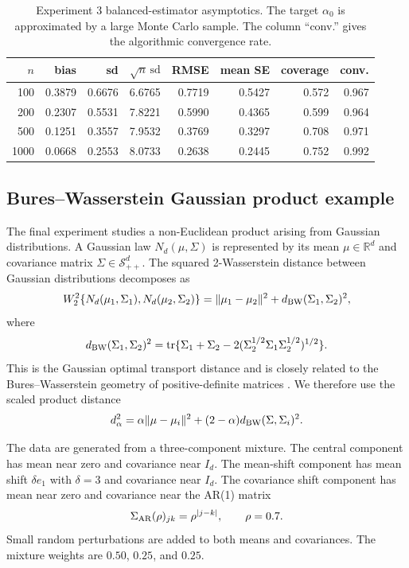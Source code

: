 \documentclass[11pt]{article}
\newcommand{\1}{\mathbf{1}}
\begin{document}
\begin{table}[t]
\centering
\small
\caption{
Experiment 3 balanced-estimator asymptotics.  The target $\alpha_0$ is
approximated by a large Monte Carlo sample.  The column ``conv.'' gives the
algorithmic convergence rate.
}
\label{tab:exp3-balanced}
\begin{tabular}{rrrrrrrr}
\toprule
$n$
& bias
& sd
& $\sqrt n\,\mathrm{sd}$
& RMSE
& mean SE
& coverage
& conv. \\
\midrule
100  & 0.3879 & 0.6676 & 6.6765 & 0.7719 & 0.5427 & 0.572 & 0.967 \\
200  & 0.2307 & 0.5531 & 7.8221 & 0.5990 & 0.4365 & 0.599 & 0.964 \\
500  & 0.1251 & 0.3557 & 7.9532 & 0.3769 & 0.3297 & 0.708 & 0.971 \\
1000 & 0.0668 & 0.2553 & 8.0733 & 0.2638 & 0.2445 & 0.752 & 0.992 \\
\bottomrule
\end{tabular}
\end{table}

\subsection{Bures--Wasserstein Gaussian product example}

The final experiment studies a non-Euclidean product arising from Gaussian
distributions.  A Gaussian law $N_d(\mu,\Sigma)$ is represented by its mean
$\mu\in\mathbb R^d$ and covariance matrix $\Sigma\in\mathcal S_{++}^d$.  The
squared 2-Wasserstein distance between Gaussian distributions decomposes as
\[
 W_2^2\{N_d(\mu_1,\Sigma_1),N_d(\mu_2,\Sigma_2)\}
 =
 \|\mu_1-\mu_2\|^2
 +
 d_{\rm BW}(\Sigma_1,\Sigma_2)^2,
\]
where
\[
 d_{\rm BW}(\Sigma_1,\Sigma_2)^2
 =
 \operatorname{tr}\{\Sigma_1+\Sigma_2
 -2(\Sigma_2^{1/2}\Sigma_1\Sigma_2^{1/2})^{1/2}\}.
\]
This is the Gaussian optimal transport distance and is closely related to the
Bures--Wasserstein geometry of positive-definite matrices \citep{dowson_1982_FrechetDistanceMultivariate, takatsu_2011_WassersteinGeometryGaussian}. We therefore use the scaled product distance
\[
 d_\alpha^2
 =
 \alpha\|\mu-\mu_i\|^2
 +(2-\alpha)d_{\rm BW}(\Sigma,\Sigma_i)^2 .
\]

The data are generated from a three-component mixture.  The central component
has mean near zero and covariance near $I_d$.  The mean-shift component has mean
shift $\delta e_1$ with $\delta=3$ and covariance near $I_d$.  The covariance
shift component has mean near zero and covariance near the AR(1) matrix
\[
 \Sigma_{\rm AR}(\rho)_{jk}=\rho^{|j-k|},
 \qquad \rho=0.7 .
\]
Small random perturbations are added to both means and covariances.  The mixture
weights are $0.50$, $0.25$, and $0.25$.
\end{document}
